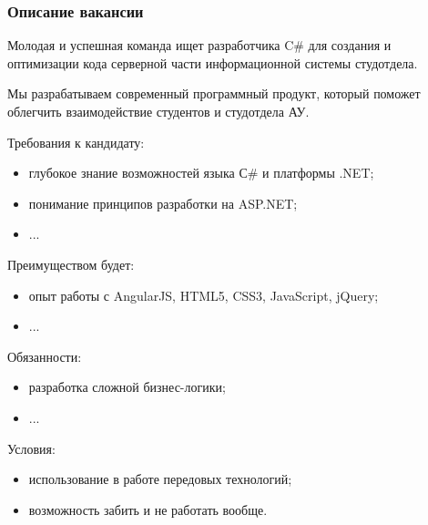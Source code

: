 \documentclass[xetex,mathserif,serif]{beamer}
\begin{document}
	\begin{frame}
		\frametitle{Описание вакансии}
		\begin{scriptsize}
			Молодая и успешная команда ищет разработчика C\# для создания и оптимизации кода серверной части информационной системы студотдела.

			Мы разрабатываем современный программный продукт, который поможет облегчить взаимодействие студентов и студотдела АУ.

			Требования к кандидату:
			\begin{itemize}
				\item глубокое знание возможностей языка С\# и платформы .NET;
				\item понимание принципов разработки на ASP.NET;
				\item ...
			\end{itemize}

			Преимуществом будет:
			\begin{itemize}
				\item опыт работы с AngularJS, HTML5, CSS3, JavaScript, jQuery;
				\item ...
			\end{itemize}

			Обязанности:
			\begin{itemize}
				\item разработка сложной бизнес-логики;
				\item ...
			\end{itemize}

			Условия:
			\begin{itemize}
				\item использование в работе передовых технологий;
				\item возможность забить и не работать вообще.
			\end{itemize}
		\end{scriptsize}
	\end{frame}
\end{document}
